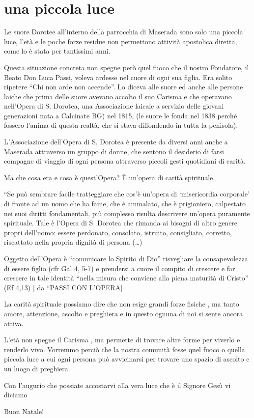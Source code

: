 \section{una piccola luce}

Le suore Dorotee all’interno della parrocchia di Maserada sono solo una piccola luce, l’età e le poche forze residue non permettono attività apostolica diretta, come lo è stata per tantissimi anni.


Questa situazione concreta non spegne però quel fuoco che il nostro Fondatore, il Beato Don Luca Passi, voleva ardesse nel cuore di ogni sua figlia. Era solito ripetere “Chi non arde non accende”. Lo diceva alle suore ed anche alle persone laiche che prima delle suore avevano accolto il suo Carisma e che  operavano nell’Opera di S. Dorotea, una Associazione laicale a servizio delle giovani generazioni nata a Calcinate BG) nel 1815,  (le suore le fonda nel 1838 perché fossero l’anima di questa realtà, che si stava diffondendo in tutta la penisola).

L’Associazione dell’Opera di S. Dorotea è presente da diversi anni anche a Maserada attraverso un gruppo di donne, che sentono il desiderio di farsi compagne di viaggio di ogni persona attraverso piccoli gesti quotidiani di carità.


Ma che cosa era e cosa è quest’Opera?   È un’opera di carità spirituale.

“Se può sembrare facile tratteggiare che cos’è un’opera di ‘misericordia corporale’ di fronte ad un uomo che ha fame, che è ammalato, che è prigioniero, calpestato nei suoi diritti fondamentali, più complesso risulta descrivere  un’opera puramente spirituale. Tale è l’Opera di S. Dorotea che rimanda ai bisogni di altro genere propri dell’uomo: essere perdonato, consolato, istruito, consigliato, corretto, riscattato nella propria dignità di persona (…) 

Oggetto dell’Opera è  “comunicare lo Spirito di Dio” risvegliare la consapevolezza di essere figlio (cfr Gal 4, 5-7) e prendersi a cuore il compito di crescere e far crescere in tale identità “nella misura che conviene alla piena maturità di Cristo” (Ef 4,13)                       [ da “PASSI CON L’OPERA]


La carità spirituale possiamo dire che non esige grandi forze fisiche , ma tanto amore, attenzione, ascolto e preghiera e in questo ognuna di noi si sente ancora attiva.

L’età non spegne il Carisma , ma permette di trovare altre forme per viverlo e renderlo vivo. Vorremmo perciò che la nostra comunità  fosse quel fuoco o quella piccola luce a cui ogni persona può avvicinarsi per trovare uno spazio di ascolto e un luogo di preghiera.

Con l’augurio che possiate accostarvi alla vera luce che è il Signore Gesù vi diciamo

Buon Natale!


